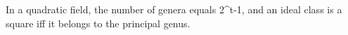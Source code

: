 In a quadratic field, the number of genera equals 2^{t-1}, and an ideal class is a square iff it belongs to the principal genus.

